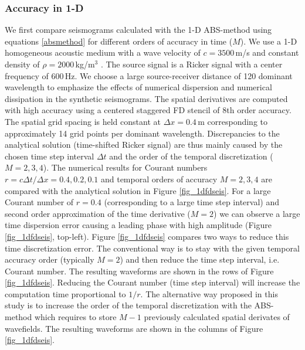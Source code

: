 \documentclass[11pt,onecolumn,oneside]{article}
\begin{document}
\subsubsection{Accuracy in 1-D}
We first compare seismograms calculated with the 1-D ABS-method using equations \ref{absmethod} for different orders of accuracy in time ($M$). We use a 1-D homogeneous acoustic 
medium with a wave velocity of $c=3500$\,m/s and constant density of $\rho=2000$\,kg/m$^3$ . The source signal is a Ricker signal with a center frequency of 600\,Hz. We choose a large source-receiver distance of 120 dominant wavelength to emphasize the effects of numerical dispersion and numerical dissipation in the synthetic seismograms. The spatial derivatives are
computed with high accuracy using a centered staggered FD stencil of 8th order accuracy.  The spatial grid spacing is held constant at $\Delta x=0.4$\,m corresponding to approximately 14 grid points per dominant wavelength. Discrepancies to the analytical solution (time-shifted Ricker signal) are thus mainly caused by the chosen time step interval $\Delta t$ and the order of the temporal discretization ($M=2,3,4$). The numerical results for Courant numbers $r=c \Delta t/\Delta x=0.4, 0.2, 0.1$ and temporal orders of accuracy $M=2, 3, 4$ are compared with the analytical solution in Figure \ref{fig_1dfdseis}.  For a large Courant number of $r=0.4$ (corresponding to a large time step interval) and second order approximation of the time derivative ($M=2$) we can observe a large time dispersion error causing a leading phase with high amplitude (Figure \ref{fig_1dfdseis}, top-left). Figure  \ref{fig_1dfdseis} compares two ways to reduce this time discretization error. The conventional way is to  stay with the given temporal accuracy order (typically $M=2$) and then reduce the time step interval, i.e. Courant number. The resulting waveforms are shown in the rows of Figure  \ref{fig_1dfdseis}.
Reducing the Courant number (time step interval) will increase the computation time proportional to $1/r$.  The alternative  way proposed in this study is to increase the order of the temporal discretization with the ABS-method which requires to store $M-1$ previously calculated spatial derivates of wavefields. The resulting waveforms are shown in the columns of  Figure  \ref{fig_1dfdseis}. \\ \\
\end{document}
